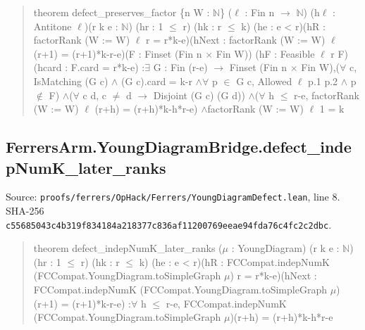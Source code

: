 \documentclass[11pt,a4paper]{article}
\begin{document}
\begin{quote}\small\ttfamily theorem defect\_preserves\_factor \{n W : \ensuremath{\mathbb{N}}\} (\ensuremath{\ell} : Fin n \ensuremath{\to} \ensuremath{\mathbb{N}}) (h\ensuremath{\ell} : Antitone \ensuremath{\ell})\newline (r k e : \ensuremath{\mathbb{N}}) (hr : 1 \ensuremath{\leq} r) (hk : r \ensuremath{\leq} k) (he : e < r)\newline (hR : factorRank (W := W) \ensuremath{\ell} r = r*k-e)\newline (hNext : factorRank (W := W) \ensuremath{\ell} (r+1) = (r+1)*k-r-e)\newline (F : Finset (Fin n \ensuremath{\times} Fin W)) (hF : Feasible \ensuremath{\ell} r F) (hcard : F.card = r*k-e) :\newline \ensuremath{\exists} G : Fin (r-e) \ensuremath{\to} Finset (Fin n \ensuremath{\times} Fin W),\newline (\ensuremath{\forall} c, IsMatching (G c) \ensuremath{\wedge} (G c).card = k-r \ensuremath{\wedge}\newline \ensuremath{\forall} p \ensuremath{\in} G c, Allowed \ensuremath{\ell} p.1 p.2 \ensuremath{\wedge} p \ensuremath{\notin} F) \ensuremath{\wedge}\newline (\ensuremath{\forall} c d, c \ensuremath{\neq} d \ensuremath{\to} Disjoint (G c) (G d)) \ensuremath{\wedge}\newline (\ensuremath{\forall} h \ensuremath{\leq} r-e, factorRank (W := W) \ensuremath{\ell} (r+h) = (r+h)*k-h*r-e) \ensuremath{\wedge}\newline factorRank (W := W) \ensuremath{\ell} 1 = k\end{quote}
\subsection{FerrersArm.YoungDiagramBridge.defect\_indepNumK\_later\_ranks}
Source: \texttt{proofs/ferrers/OpHack/Ferrers/YoungDiagramDefect.lean}, line 8. SHA-256 \texttt{c55685043c4b319f834184a218377c836af11200769eeae94fda76c4fc2c2dbc}.

\begin{quote}\small\ttfamily theorem defect\_indepNumK\_later\_ranks (\ensuremath{\mu} : YoungDiagram) (r k e : \ensuremath{\mathbb{N}})\newline (hr : 1 \ensuremath{\leq} r) (hk : r \ensuremath{\leq} k) (he : e < r)\newline (hR : FCCompat.indepNumK (FCCompat.YoungDiagram.toSimpleGraph \ensuremath{\mu}) r = r*k-e)\newline (hNext : FCCompat.indepNumK (FCCompat.YoungDiagram.toSimpleGraph \ensuremath{\mu})\newline (r+1) = (r+1)*k-r-e) :\newline \ensuremath{\forall} h \ensuremath{\leq} r-e, FCCompat.indepNumK (FCCompat.YoungDiagram.toSimpleGraph \ensuremath{\mu})\newline (r+h) = (r+h)*k-h*r-e\end{quote}
\end{document}

